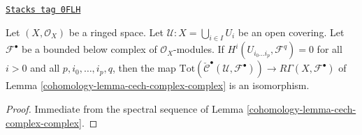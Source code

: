 \begin{lemma}
\label{cohomology-lemma-cech-complex-complex-computes}
\href{https://stacks.math.columbia.edu/tag/0FLH}{\texttt{Stacks tag 0FLH}}

Let $(X, \mathcal{O}_X)$ be a ringed space.
Let $\mathcal{U} : X = \bigcup_{i \in I} U_i$ be
an open covering. Let $\mathcal{F}^\bullet$ be a bounded below complex
of $\mathcal{O}_X$-modules. If $H^i(U_{i_0 \ldots i_p}, \mathcal{F}^q) = 0$
for all $i > 0$ and all $p, i_0, \ldots, i_p, q$, then the map
$
\text{Tot}(\check{\mathcal{C}}^\bullet(\mathcal{U}, \mathcal{F}^\bullet))
\to
R\Gamma(X, \mathcal{F}^\bullet)
$
of Lemma \ref{cohomology-lemma-cech-complex-complex} is an isomorphism.
\end{lemma}

\begin{proof}

Immediate from the spectral sequence of Lemma \ref{cohomology-lemma-cech-complex-complex}.
\end{proof}

